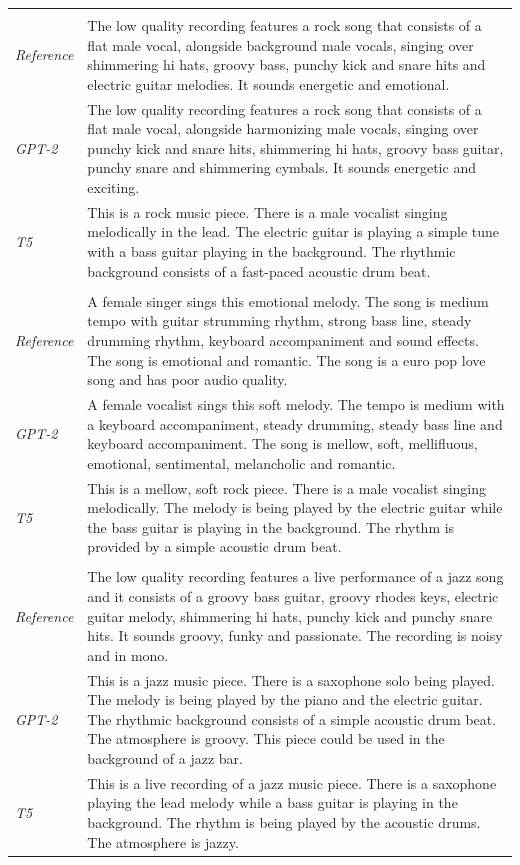 \begin{table}[ht]
\begin{tabularx}{\textwidth}{lX}
\multicolumn{2}{l}{} \\[-0.5em]
\textit{Reference} & The low quality recording features a rock song that consists of a flat male vocal, alongside background male vocals, singing over shimmering hi hats, groovy bass, punchy kick and snare hits and electric guitar melodies. It sounds energetic and emotional. \\
\textit{GPT-2} & The low quality recording features a rock song that consists of a flat male vocal, alongside harmonizing male vocals, singing over punchy kick and snare hits, shimmering hi hats, groovy bass guitar, punchy snare and shimmering cymbals. It sounds energetic and exciting. \\
\textit{T5} & This is a rock music piece. There is a male vocalist singing melodically in the lead. The electric guitar is playing a simple tune with a bass guitar playing in the background. The rhythmic background consists of a fast-paced acoustic drum beat. \\
\midrule

\multicolumn{2}{l}{} \\[-0.5em]
\textit{Reference} & A female singer sings this emotional melody. The song is medium tempo with guitar strumming rhythm, strong bass line, steady drumming rhythm, keyboard accompaniment and sound effects. The song is emotional and romantic. The song is a euro pop love song and has poor audio quality. \\
\textit{GPT-2} & A female vocalist sings this soft melody. The tempo is medium with a keyboard accompaniment, steady drumming, steady bass line and keyboard accompaniment. The song is mellow, soft, mellifluous, emotional, sentimental, melancholic and romantic. \\
\textit{T5} & This is a mellow, soft rock piece. There is a male vocalist singing melodically. The melody is being played by the electric guitar while the bass guitar is playing in the background. The rhythm is provided by a simple acoustic drum beat. \\
\midrule

\multicolumn{2}{l}{} \\[-0.5em]
\textit{Reference} & The low quality recording features a live performance of a jazz song and it consists of a groovy bass guitar, groovy rhodes keys, electric guitar melody, shimmering hi hats, punchy kick and punchy snare hits. It sounds groovy, funky and passionate. The recording is noisy and in mono. \\
\textit{GPT-2} & This is a jazz music piece. There is a saxophone solo being played. The melody is being played by the piano and the electric guitar. The rhythmic background consists of a simple acoustic drum beat. The atmosphere is groovy. This piece could be used in the background of a jazz bar. \\
\textit{T5} & This is a live recording of a jazz music piece. There is a saxophone playing the lead melody while a bass guitar is playing in the background. The rhythm is being played by the acoustic drums. The atmosphere is jazzy. \\
\midrule


\end{tabularx}
\end{table}
